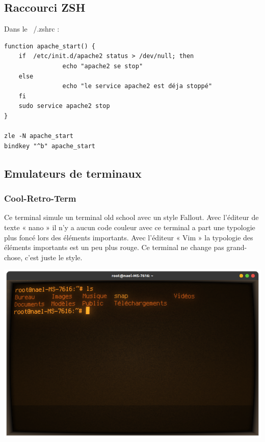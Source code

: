 \documentclass{article}
\begin{document}
\subsection{Raccourci ZSH} %
Dans le ~/.zshrc :

\begin{commandline}
	\begin{verbatim}
function apache_start() {
	if  /etc/init.d/apache2 status > /dev/null; then
        		echo "apache2 se stop"
	else
        		echo "le service apache2 est déja stoppé"
	fi
	sudo service apache2 stop
}

zle -N apache_start
bindkey "^b" apache_start

	\end{verbatim}
\end{commandline}

\newpage

\subsection{Emulateurs de terminaux}

\subsubsection{ Cool-Retro-Term}
\noindent Ce terminal simule un terminal old school avec un style Fallout.
Avec l’éditeur de texte « nano » il n’y a aucun code couleur avec ce terminal a part une typologie plus foncé lors des éléments importants.
Avec l’éditeur « Vim » la typologie des éléments importants est un peu plus rouge.
Ce terminal ne change pas grand-chose, c’est juste le style.

\begin{center}
\includegraphics[scale=0.2]{image/coolRetroTerm.png}
\end{center}
\end{document}

